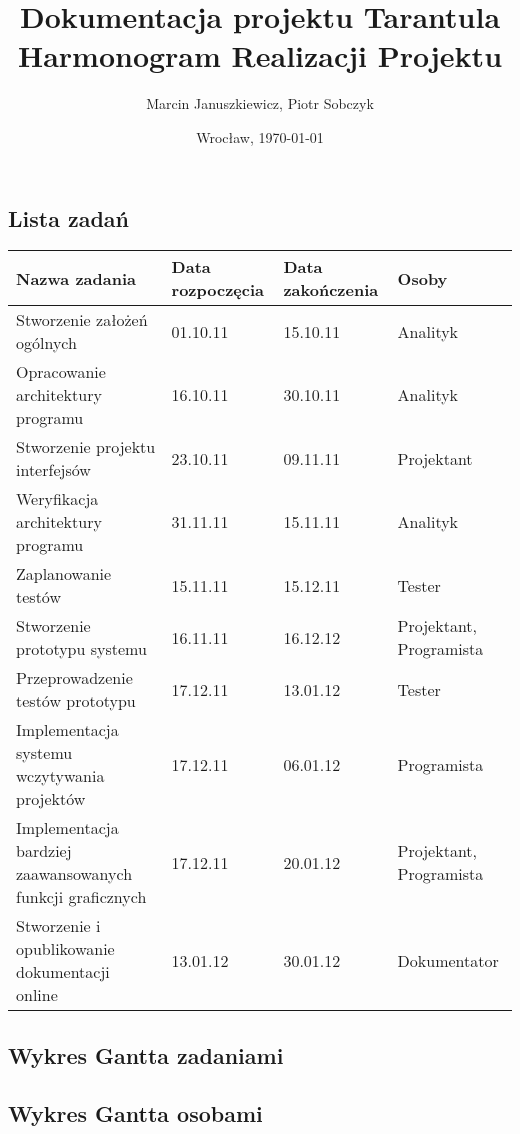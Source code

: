 \documentclass[11pt,leqno]{article}
\title{\LARGE Dokumentacja projektu \textbf{Tarantula}\\
							Harmonogram Realizacji Projektu}
\author{Marcin Januszkiewicz, Piotr Sobczyk}
\date{Wrocław, \today}
\begin{document}
\maketitle 
\newpage
\tableofcontents
\newpage
\thispagestyle{empty}
\begin{landscape}
\section{Lista zadań}
\begin{tabular}{|p{10cm}|l|l|l|}
\hline
Nazwa zadania & Data rozpoczęcia & Data zakończenia & Osoby \\ \hline
Stworzenie założeń ogólnych & 01.10.11 & 15.10.11 & Analityk \\ \hline
Opracowanie architektury programu & 16.10.11 & 30.10.11 & Analityk \\ \hline
Stworzenie projektu interfejsów & 23.10.11 & 09.11.11 & Projektant \\ \hline
Weryfikacja architektury programu & 31.11.11 & 15.11.11 & Analityk \\ \hline
Zaplanowanie testów & 15.11.11 & 15.12.11 & Tester \\ \hline
Stworzenie prototypu systemu & 16.11.11 & 16.12.12 & Projektant, Programista \\ \hline
Przeprowadzenie testów prototypu & 17.12.11 & 13.01.12 & Tester \\ \hline
Implementacja systemu wczytywania projektów & 17.12.11 & 06.01.12 & Programista \\ \hline
Implementacja bardziej zaawansowanych funkcji graficznych & 17.12.11 & 20.01.12 & Projektant, Programista \\ \hline
Stworzenie i opublikowanie dokumentacji online & 13.01.12 & 30.01.12 & Dokumentator \\ \hline
\end{tabular}
\end{landscape}

\newpage
\begin{landscape}

\section{Wykres Gantta zadaniami}
\begin{center}
\end{center}

\end{landscape}

\newpage
\begin{landscape}

\section{Wykres Gantta osobami}
\begin{center}
\end{center}

\end{landscape}
\end{document}
